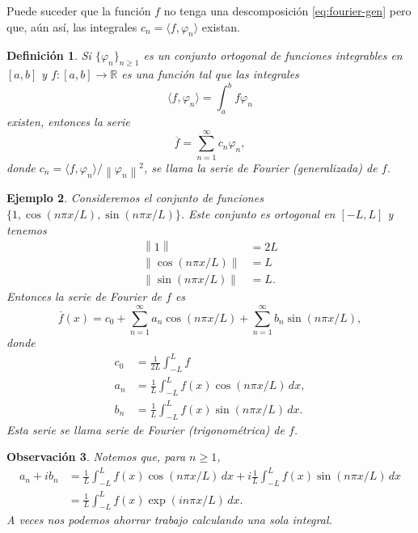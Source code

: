 \documentclass[11pt,letterpaper]{report}
\newtheorem{defn}{Definición}[chapter]
\newtheorem{example}[defn]{Ejemplo}
\newtheorem{obs}[defn]{Observación}
\newcommand\R{\mathbb R}
\newcommand\norm[1]{\left\|#1\right\|}
\newcommand\<{\langle}
\renewcommand\>{\rangle}
\renewcommand\phi\varphi
\begin{document}
Puede suceder que la función $f$ no tenga una descomposición
\eqref{eq:fourier-gen} pero que, aún así,
las integrales $c_n=\<f,\phi_n\>$ existan.

\begin{defn}
  Si $\{\phi_n\}_{n\geq 1}$ es un conjunto ortogonal de funciones
  integrables en $[a,b]$ y $f:[a,b]\to\R$ es una función
  tal que las integrales
  \[
   \<f,\phi_n\> = \int_{a}^{b}f\phi_n
  \]
  existen, entonces la serie
  \[
    \overline{f}=\sum_{n=1}^{\infty}c_n\phi_n
  ,\]
  donde $c_n = \<f,\phi_n\>/\norm{\phi_n}^{2}$, se llama
  la serie de Fourier (generalizada) de $f$.
\end{defn}

\begin{example}
  Consideremos el conjunto de funciones
  $\{1,\cos(n\pi x/L),\sin(n\pi x/L)\}$.
  Este conjunto es ortogonal en $[-L,L]$ y tenemos
  \begin{align*}
    \norm{1} &= 2L \\
    \norm{\cos(n\pi x/L)} &= L \\
    \norm{\sin(n\pi x/L)} &= L.
  \end{align*}
  Entonces la serie de Fourier de $f$ es
  \begin{equation}\label{eq:serie-fourier}
    \overline{f}(x) = c_0
    + \sum_{n=1}^\infty a_n\cos(n\pi x/L)
    + \sum_{n=1}^\infty b_n\sin(n\pi x/L)
  ,
  \end{equation}
  donde
  \begin{align*}
    c_0 &= \frac{1}{2L}\int_{-L}^L f \\
    a_n &= \frac{1}{L}\int_{-L}^L f(x)\cos(n\pi x/L)\,dx, \\
    b_n &= \frac{1}{L}\int_{-L}^L f(x)\sin(n\pi x/L)\,dx.
  \end{align*}
  Esta serie se llama serie de Fourier (trigonométrica) de $f$.
\end{example}

\begin{obs}
Notemos que, para $n\geq 1$,
\begin{align*}
  a_n+ib_n
  &= \frac{1}{L}\int_{-L}^L f(x)\cos(n\pi x/L)\,dx
    + i\frac{1}{L}\int_{-L}^L f(x)\sin(n\pi x/L)\,dx \\
  &= \frac{1}{L}\int_{-L}^L f(x)\exp(in\pi x/L)\,dx.
\end{align*}
A veces nos podemos ahorrar trabajo calculando una sola integral.
\end{obs}
\end{document}

